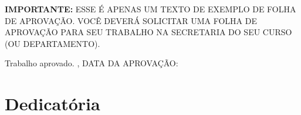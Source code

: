 \documentclass[
    12pt,               %
    openright,          %
    oneside,            %
    a4paper,            %
    section=TITLE,     %
    english,            %
    french,             %
    spanish,            %
    brazil              %
    ]{abntex2}
\renewcommand{\ABNTEXchapterfont}{\sffamily}
\renewcommand{\ABNTEXsubsectionfontsize}{\normalsize}
\renewcommand{\ABNTEXchapterfont}{\sffamily\bfseries}
\begin{document}


\begin{folhadeaprovacao}
  
  \begin{center}
    {\ABNTEXchapterfont\ABNTEXsubsectionfontsize\imprimirautor}

    \vspace*{\fill}\vspace*{\fill}
    {\ABNTEXchapterfont\ABNTEXsubsectionfontsize\bfseries\imprimirtitulo}
    \vspace*{\fill}
    
    \hspace{.45\textwidth}
    \begin{minipage}{.5\textwidth}
        \textbf{IMPORTANTE:} ESSE É APENAS UM TEXTO DE EXEMPLO DE FOLHA DE
        APROVAÇÃO. VOCÊ DEVERÁ SOLICITAR UMA FOLHA DE
        APROVAÇÃO PARA SEU TRABALHO NA SECRETARIA DO SEU CURSO (OU
        DEPARTAMENTO).
    \end{minipage}%
    \vspace*{\fill}
   \end{center}
        
   Trabalho aprovado. \imprimirlocal, DATA DA APROVAÇÃO:

      
   \begin{center}
    \vspace*{0.5cm}
    {\ABNTEXchapterfont\ABNTEXsubsectionfontsize\imprimirlocal}
    \par
    {\ABNTEXchapterfont\ABNTEXsubsectionfontsize\imprimirdata}
    \vspace*{1cm}
  \end{center}
  
\end{folhadeaprovacao}



\chapter*{Dedicatória}
\end{document}
